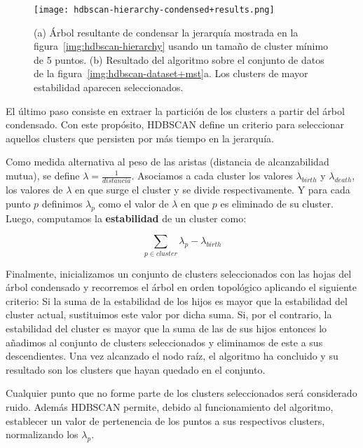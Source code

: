 \begin{figure}[!h]
    \centering
    \texttt{[image: hdbscan-hierarchy-condensed+results.png]}
    \caption{(a) Árbol resultante de condensar la jerarquía mostrada en la figura~\ref{img:hdbscan-hierarchy} usando un tamaño de cluster mínimo de 5 puntos. (b) Resultado del algoritmo sobre el conjunto de datos de la figura~\ref{img:hdbscan-dataset+mst}a.
    Los clusters de mayor estabilidad aparecen seleccionados.}
    \label{img:hdbscan-hierarchy-condensed+results}
\end{figure}

El último paso consiste en extraer la partición de los clusters a partir del árbol condensado.
Con este propósito, HDBSCAN define un criterio para seleccionar aquellos clusters que persisten por más tiempo en la jerarquía.

Como medida alternativa al peso de las aristas (distancia de alcanzabilidad mutua), se define $\lambda=\frac{1}{distancia}$.
Asociamos a cada cluster los valores $\lambda_{birth}$ y $\lambda_{death}$, los valores de $\lambda$ en que surge el cluster y se divide respectivamente.
Y para cada punto $p$ definimos $\lambda_p$ como el valor de $\lambda$ en que $p$ es eliminado de su cluster.
Luego, computamos la \textbf{estabilidad} de un cluster como:

\[
    \sum_{p\in cluster}{\lambda_p - \lambda_{birth}}
\]

Finalmente, inicializamos un conjunto de clusters seleccionados con las hojas del árbol condensado y recorremos el árbol en orden topológico aplicando el siguiente criterio:
Si la suma de la estabilidad de los hijos es mayor que la estabilidad del cluster actual, sustituimos este valor por dicha suma.
Si, por el contrario, la estabilidad del cluster es mayor que la suma de las de sus hijos entonces lo añadimos al conjunto de clusters seleccionados y eliminamos de este a sus descendientes.
Una vez alcanzado el nodo raíz, el algoritmo ha concluido y su resultado son los clusters que hayan quedado en el conjunto.

Cualquier punto que no forme parte de los clusters seleccionados será considerado ruido.
Además HDBSCAN permite, debido al funcionamiento del algoritmo, establecer un valor de pertenencia de los puntos a sus respectivos clusters, normalizando los $\lambda_p$.

